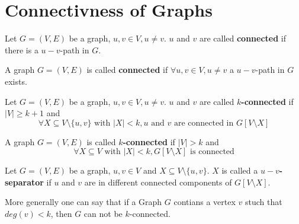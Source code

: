 \section{Connectivness of Graphs}

\begin{definition}

                Let $G = (V, E)$ be a graph, $u, v \in V, u \neq v$. $u$ and $v$ are called \textbf{connected} if there is
                a $u-v$-path in $G$.
            
\end{definition}

\begin{definition}

                A graph $G = (V, E)$ is called \textbf{connected} if $\forall u, v \in V, u \neq v$ a $u-v$-path in $G$
                exists.
            
\end{definition}

\begin{definition}

                Let $G = (V, E)$ be a graph, $u, v \in V, u \neq v$. $u$ and $v$ are called \textbf{$k$-connected} if $|V|
                \ge k+1$ and
                $$\forall X \subseteq V \setminus \{u, v\} \text{ with } |X| \lt k, u \text{ and } v \text{ are
                connected in } G[V \setminus X]$$
            
\end{definition}

\begin{definition}

                A graph $G = (V, E)$ is called \textbf{$k$-connected} if $|V| \gt k$ and
                $$\forall X \subseteq V \text{ with } |X| \lt k, G[V \setminus X] \text{ is connected}$$
            
\end{definition}

\begin{definition}

                Let $G = (V, E)$ be a graph, $u, v \in V$ and $X \subseteq V \setminus \{u, v\}$. $X$ is called a
                \textbf{$u-v$-separator} if $u$ and $v$ are in different connected components of $G[V \setminus X]$.
            
\end{definition}

            More generally one can say that if a Graph $G$ contians a vertex $v$ stuch that $deg(v) \lt k$, then $G$ can
            not be $k$-connected.

